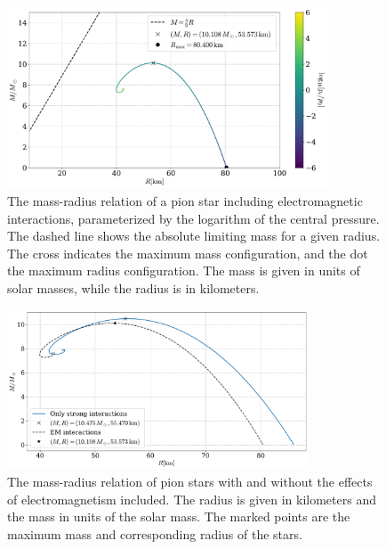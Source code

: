 \begin{figure}[!htb]
    \centering
    \includegraphics[width=0.85\textwidth]{../scripts/figurer/pion_star/mass_radius_pion_star_EM.pdf}
    \caption{
        The mass-radius relation of a pion star including electromagnetic interactions, parameterized by the logarithm of the central pressure.
        The dashed line shows the absolute limiting mass for a given radius.
        The cross indicates the maximum mass configuration, and the dot the maximum radius configuration.
        The mass is given in units of solar masses, while the radius is in kilometers.
        }
    \label{fig: mass-radius relation leading order pion star with em interaction}
\end{figure}


\begin{figure}[!htb]
    \centering
    \includegraphics[width=0.8\textwidth]{../scripts/figurer/pion_star/mass_radius_pion_star_compare.pdf}
    \caption{
        The mass-radius relation of pion stars with and without the effects of electromagnetism included.
        The radius is given in kilometers and the mass in units of the solar mass.
        The marked points are the maximum mass and corresponding radius of the stars.
        }
        \label{fig: mass-radius relation comparison}
\end{figure}



